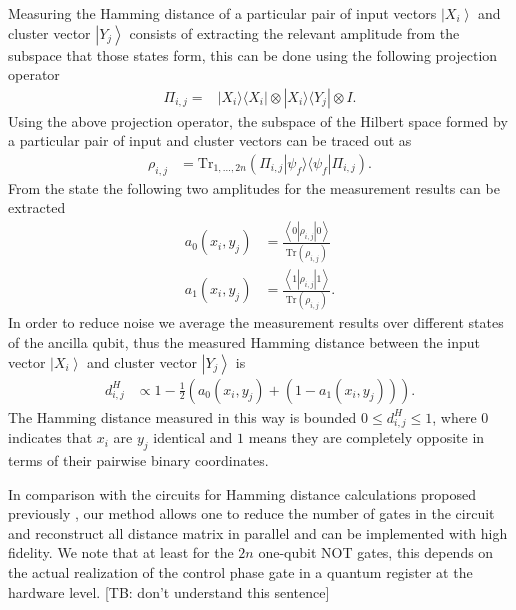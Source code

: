 \documentclass[pra,showkeys,twocolumn,showpacs]{revtex4-1}
\begin{document}
Measuring the Hamming distance of a particular pair of input vectors $\left| X_i \right\rangle$ and cluster vector $\left| Y_j \right\rangle$ consists of extracting the relevant amplitude from the subspace that those states form, this can be done using the following projection operator
%
\begin{align}
\Pi_{i,j} = &\left| X_i \rangle\langle X_i \right| \otimes \left| X_i \rangle\langle Y_j \right| \otimes I .
\end{align} 
%
Using the above projection operator, the subspace of the Hilbert space formed by a particular pair of input and cluster vectors can be traced out as
%
\begin{align}
    \rho_{i,j} &= \text{Tr}_{1,\dots,2n} (\Pi_{i,j} \left| \psi_f \rangle\langle \psi_f \right| \Pi_{i,j}) .
\end{align}
%
From the state the following two amplitudes for the measurement results can be extracted
%
\begin{align}
    a_0(x_i,y_j) & = \frac{\left\langle 0 |\rho_{i,j}| 0 \right\rangle}{\text{Tr}(\rho_{i,j})}  \\
    a_1(x_i,y_j) & = \frac{\left\langle 1 |\rho_{i,j}| 1 \right\rangle}{\text{Tr}(\rho_{i,j})} .
\end{align}
%
In order to reduce noise we average the measurement results over different states of the ancilla qubit, thus the measured Hamming distance between the input vector $\left| X_i \right\rangle$ and cluster vector $\left| Y_j \right\rangle$ is
%
\begin{align}
    d_{i,j}^H & \propto 1 - \frac{1}{2}(a_0(x_i,y_j) + (1-a_1(x_i,y_j))) .
\end{align}
%
The Hamming distance measured in this way is bounded $0 \leq d_{i,j}^H \leq 1$, where  $0$ indicates that $x_i$ are $y_j$ identical and $1$ means they are completely opposite in terms of their pairwise binary coordinates.

In comparison with the circuits for Hamming distance calculations proposed previously \cite{trugenberger2001}, our method allows one to reduce the number of gates in the circuit and reconstruct all distance matrix in parallel and can be implemented with high fidelity.  We note that at least for the $2n$ one-qubit NOT gates, this depends on the actual realization of the control phase gate in a quantum register at the hardware level.  [TB: don't understand this sentence]

\end{document}

